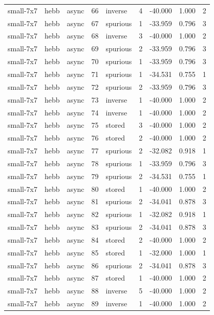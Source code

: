 \begin{tabular}{lllrlrrrr}
small-7x7 & hebb & async & 66 & inverse & 4 & -40.000 & 1.000 & 2 \\
small-7x7 & hebb & async & 67 & spurious & 1 & -33.959 & 0.796 & 3 \\
small-7x7 & hebb & async & 68 & inverse & 3 & -40.000 & 1.000 & 2 \\
small-7x7 & hebb & async & 69 & spurious & 2 & -33.959 & 0.796 & 3 \\
small-7x7 & hebb & async & 70 & spurious & 1 & -33.959 & 0.796 & 3 \\
small-7x7 & hebb & async & 71 & spurious & 1 & -34.531 & 0.755 & 1 \\
small-7x7 & hebb & async & 72 & spurious & 2 & -33.959 & 0.796 & 3 \\
small-7x7 & hebb & async & 73 & inverse & 1 & -40.000 & 1.000 & 2 \\
small-7x7 & hebb & async & 74 & inverse & 1 & -40.000 & 1.000 & 2 \\
small-7x7 & hebb & async & 75 & stored & 3 & -40.000 & 1.000 & 2 \\
small-7x7 & hebb & async & 76 & stored & 2 & -40.000 & 1.000 & 2 \\
small-7x7 & hebb & async & 77 & spurious & 2 & -32.082 & 0.918 & 1 \\
small-7x7 & hebb & async & 78 & spurious & 1 & -33.959 & 0.796 & 3 \\
small-7x7 & hebb & async & 79 & spurious & 2 & -34.531 & 0.755 & 1 \\
small-7x7 & hebb & async & 80 & stored & 1 & -40.000 & 1.000 & 2 \\
small-7x7 & hebb & async & 81 & spurious & 2 & -34.041 & 0.878 & 3 \\
small-7x7 & hebb & async & 82 & spurious & 1 & -32.082 & 0.918 & 1 \\
small-7x7 & hebb & async & 83 & spurious & 2 & -34.041 & 0.878 & 3 \\
small-7x7 & hebb & async & 84 & stored & 2 & -40.000 & 1.000 & 2 \\
small-7x7 & hebb & async & 85 & stored & 1 & -32.000 & 1.000 & 1 \\
small-7x7 & hebb & async & 86 & spurious & 2 & -34.041 & 0.878 & 3 \\
small-7x7 & hebb & async & 87 & stored & 1 & -40.000 & 1.000 & 2 \\
small-7x7 & hebb & async & 88 & inverse & 5 & -40.000 & 1.000 & 2 \\
small-7x7 & hebb & async & 89 & inverse & 1 & -40.000 & 1.000 & 2 \\

\end{tabular}
